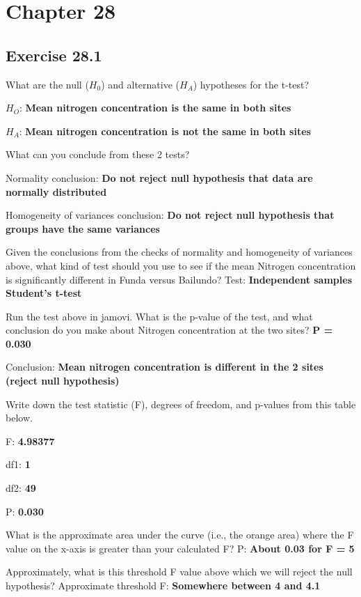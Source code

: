 \documentclass[
]{scrbook}
\begin{document}
\hypertarget{chapter-28}{%
\section{Chapter 28}\label{chapter-28}}

\hypertarget{exercise-28.1}{%
\subsection{Exercise 28.1}\label{exercise-28.1}}

What are the null (\(H_{0}\)) and alternative (\(H_{A}\)) hypotheses for the t-test?

\(H_{O}\): \textbf{Mean nitrogen concentration is the same in both sites}

\(H_{A}\): \textbf{Mean nitrogen concentration is not the same in both sites}

What can you conclude from these 2 tests?

Normality conclusion: \textbf{Do not reject null hypothesis that data are normally distributed}

Homogeneity of variances conclusion: \textbf{Do not reject null hypothesis that groups have the same variances}

Given the conclusions from the checks of normality and homogeneity of variances above, what kind of test should you use to see if the mean Nitrogen concentration is significantly different in Funda versus Bailundo? Test: \textbf{Independent samples Student's t-test}

Run the test above in jamovi. What is the p-value of the test, and what conclusion do you make about Nitrogen concentration at the two sites? \textbf{P = 0.030}

Conclusion: \textbf{Mean nitrogen concentration is different in the 2 sites (reject null hypothesis)}

Write down the test statistic (F), degrees of freedom, and p-values from this table below.

F: \textbf{4.98377}

df1: \textbf{1}

df2: \textbf{49}

P: \textbf{0.030}

What is the approximate area under the curve (i.e., the orange area) where the F value on the x-axis is greater than your calculated F? P: \textbf{About 0.03 for F = 5}

Approximately, what is this threshold F value above which we will reject the null hypothesis?
Approximate threshold F: \textbf{Somewhere between 4 and 4.1}
\end{document}
